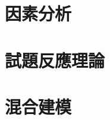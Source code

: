 \documentclass[letterpaper,10pt,english]{sphinxmanual}
\begin{document}
\chapter{因素分析}
\label{\detokenize{notebook/factor-analysis:id1}}\label{\detokenize{notebook/factor-analysis::doc}}

\chapter{試題反應理論}
\label{\detokenize{notebook/item-response-theory:id1}}\label{\detokenize{notebook/item-response-theory::doc}}

\chapter{混合建模}
\label{\detokenize{notebook/mixture-modeling:id1}}\label{\detokenize{notebook/mixture-modeling::doc}}






\renewcommand{\indexname}{Index}
\printindex
\end{document}
